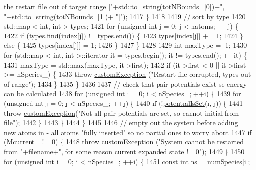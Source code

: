 \begin{DoxyCode}
{       the restart file out of target range ["}+std::to\_string(totNBounds\_[0])+\textcolor{stringliteral}{", "}+std::to\_string(totNBounds\_[1])+\textcolor{stringliteral}{
      "]"});
1417     \}
1418 
1419     \textcolor{comment}{// sort by type}
1420     std::map < int, int > types;
1421     \textcolor{keywordflow}{for} (\textcolor{keywordtype}{unsigned} \textcolor{keywordtype}{int} j = 0; j < natoms; ++j) \{
1422         \textcolor{keywordflow}{if} (types.find(index[j]) != types.end()) \{
1423             types[index[j]] += 1;
1424         \} \textcolor{keywordflow}{else} \{
1425             types[index[j]] = 1;
1426         \}
1427     \}
1428 
1429     \textcolor{keywordtype}{int} maxType = -1;
1430     \textcolor{keywordflow}{for} (std::map < int, int >::iterator it = types.begin(); it != types.end(); ++it) \{
1431         maxType = std::max(maxType, it->first);
1432         \textcolor{keywordflow}{if} (it->first < 0 || it->first >= nSpecies\_) \{
1433             \textcolor{keywordflow}{throw} \hyperlink{classcustom_exception}{customException} (\textcolor{stringliteral}{"Restart file corrupted, types out of range"});
1434         \}
1435     \}
1436 
1437     \textcolor{comment}{// check that pair potentials exist so energy can be calculated}
1438     \textcolor{keywordflow}{for} (\textcolor{keywordtype}{unsigned} \textcolor{keywordtype}{int} i = 0; i < nSpecies\_; ++i) \{
1439         \textcolor{keywordflow}{for} (\textcolor{keywordtype}{unsigned} \textcolor{keywordtype}{int} j = 0; j < nSpecies\_; ++j) \{
1440             \textcolor{keywordflow}{if} (!\hyperlink{classsim_system_a40af191fae6091e26413ee06ae188ae9}{potentialIsSet}(i, j)) \{
1441                 \textcolor{keywordflow}{throw} \hyperlink{classcustom_exception}{customException}(\textcolor{stringliteral}{"Not all pair potentials are set, so cannot initial
       from file"});
1442             \}
1443         \}
1444     \}
1445 
1446     \textcolor{comment}{// empty out the system before adding new atoms in - all atoms "fully inserted" so no partial ones to
       worry about}
1447     \textcolor{keywordflow}{if} (Mcurrent\_ != 0) \{
1448         \textcolor{keywordflow}{throw} \hyperlink{classcustom_exception}{customException} (\textcolor{stringliteral}{"System cannot be restarted from "}+filename+\textcolor{stringliteral}{", for some
       reason current expanded state != 0"});
1449     \}
1450     \textcolor{keywordflow}{for} (\textcolor{keywordtype}{unsigned} \textcolor{keywordtype}{int} i = 0; i < nSpecies\_; ++i) \{
1451         \textcolor{keyword}{const} \textcolor{keywordtype}{int} ns = \hyperlink{classsim_system_a9eea865e6dc1cff377b1e79c4d9c23f0}{numSpecies}[i];

\end{DoxyCode}
